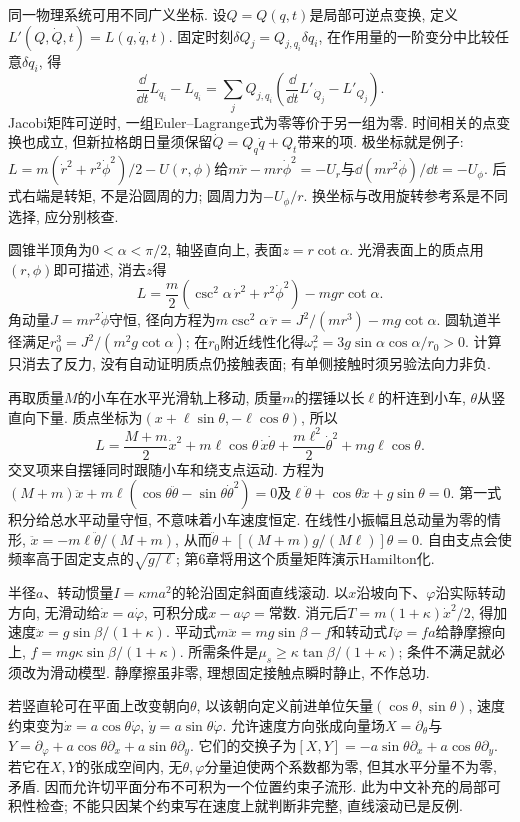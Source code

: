 同一物理系统可用不同广义坐标. 设$Q=Q(q,t)$是局部可逆点变换, 定义$L'(Q,\dot Q,t)=L(q,\dot q,t)$. 固定时刻$\delta Q_j=Q_{j,q_i}\delta q_i$, 在作用量的一阶变分中比较任意$\delta q_i$, 得
\[
\frac{\dd}{\dd t}L_{\dot q_i}-L_{q_i}
=\sum_j Q_{j,q_i}\left(\frac{\dd}{\dd t}L'_{\dot Q_j}-L'_{Q_j}\right).
\]
Jacobi矩阵可逆时, 一组Euler--Lagrange式为零等价于另一组为零. 时间相关的点变换也成立, 但新拉格朗日量须保留$\dot Q=Q_q\dot q+Q_t$带来的项. 极坐标就是例子: $L=m(\dot r^2+r^2\dot\phi^2)/2-U(r,\phi)$给$m\ddot r-mr\dot\phi^2=-U_r$与$\dd(mr^2\dot\phi)/\dd t=-U_\phi$. 后式右端是转矩, 不是沿圆周的力; 圆周力为$-U_\phi/r$. 换坐标与改用旋转参考系是不同选择, 应分别核查.

圆锥半顶角为$0<\alpha<\pi/2$, 轴竖直向上, 表面$z=r\cot\alpha$. 光滑表面上的质点用$(r,\phi)$即可描述, 消去$z$得
\[
L=\frac m2\left(\csc^2\alpha\,\dot r^2+r^2\dot\phi^2\right)
-mgr\cot\alpha.
\]
角动量$J=mr^2\dot\phi$守恒, 径向方程为$m\csc^2\alpha\,\ddot r=J^2/(mr^3)-mg\cot\alpha$. 圆轨道半径满足$r_0^3=J^2/(m^2g\cot\alpha)$; 在$r_0$附近线性化得$\omega_r^2=3g\sin\alpha\cos\alpha/r_0>0$. 计算只消去了反力, 没有自动证明质点仍接触表面; 有单侧接触时须另验法向力非负.

再取质量$M$的小车在水平光滑轨上移动, 质量$m$的摆锤以长$\ell$的杆连到小车, $\theta$从竖直向下量. 质点坐标为$(x+\ell\sin\theta,-\ell\cos\theta)$, 所以
\[
L=\frac{M+m}{2}\dot x^2+m\ell\cos\theta\,\dot x\dot\theta
+\frac{m\ell^2}{2}\dot\theta^2+mg\ell\cos\theta.
\]
交叉项来自摆锤同时跟随小车和绕支点运动. 方程为$(M+m)\ddot x+m\ell(\cos\theta\ddot\theta-\sin\theta\dot\theta^2)=0$及$\ell\ddot\theta+\cos\theta\ddot x+g\sin\theta=0$. 第一式积分给总水平动量守恒, 不意味着小车速度恒定. 在线性小振幅且总动量为零的情形, $\ddot x=-m\ell\ddot\theta/(M+m)$, 从而$\ddot\theta+[(M+m)g/(M\ell)]\theta=0$. 自由支点会使频率高于固定支点的$\sqrt{g/\ell}$; 第6章将用这个质量矩阵演示Hamilton化.

半径$a$、转动惯量$I=\kappa ma^2$的轮沿固定斜面直线滚动. 以$x$沿坡向下、$\varphi$沿实际转动方向, 无滑动给$\dot x=a\dot\varphi$, 可积分成$x-a\varphi=$常数. 消元后$T=m(1+\kappa)\dot x^2/2$, 得加速度$\ddot x=g\sin\beta/(1+\kappa)$. 平动式$m\ddot x=mg\sin\beta-f$和转动式$I\ddot\varphi=fa$给静摩擦向上, $f=mg\kappa\sin\beta/(1+\kappa)$. 所需条件是$\mu_s\ge\kappa\tan\beta/(1+\kappa)$; 条件不满足就必须改为滑动模型. 静摩擦虽非零, 理想固定接触点瞬时静止, 不作总功.

若竖直轮可在平面上改变朝向$\theta$, 以该朝向定义前进单位矢量$(\cos\theta,\sin\theta)$, 速度约束变为$\dot x=a\cos\theta\dot\varphi$, $\dot y=a\sin\theta\dot\varphi$. 允许速度方向张成向量场$X=\partial_\theta$与$Y=\partial_\varphi+a\cos\theta\partial_x+a\sin\theta\partial_y$. 它们的交换子为$[X,Y]=-a\sin\theta\partial_x+a\cos\theta\partial_y$. 若它在$X,Y$的张成空间内, 无$\theta,\varphi$分量迫使两个系数都为零, 但其水平分量不为零, 矛盾. 因而允许切平面分布不可积为一个位置约束子流形. 此为中文补充的局部可积性检查; 不能只因某个约束写在速度上就判断非完整, 直线滚动已是反例.

